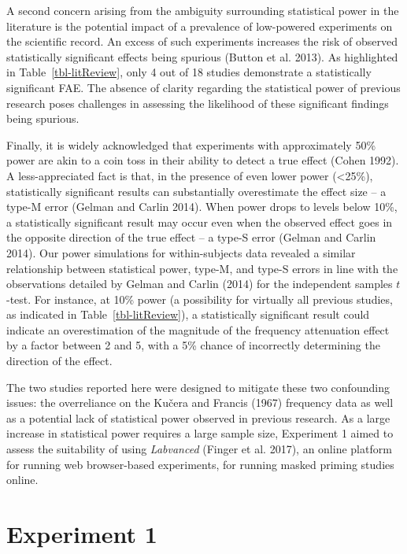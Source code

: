 \documentclass[
]{interact}
\begin{document}
A second concern arising from the ambiguity surrounding statistical
power in the literature is the potential impact of a prevalence of
low-powered experiments on the scientific record. An excess of such
experiments increases the risk of observed statistically significant
effects being spurious (Button et al. 2013). As highlighted in
Table~\ref{tbl-litReview}, only 4 out of 18 studies demonstrate a
statistically significant FAE. The absence of clarity regarding the
statistical power of previous research poses challenges in assessing the
likelihood of these significant findings being spurious.

Finally, it is widely acknowledged that experiments with approximately
50\% power are akin to a coin toss in their ability to detect a true
effect (Cohen 1992). A less-appreciated fact is that, in the presence of
even lower power (\textless25\%), statistically significant results can
substantially overestimate the effect size -- a type-M error (Gelman and
Carlin 2014). When power drops to levels below 10\%, a statistically
significant result may occur even when the observed effect goes in the
opposite direction of the true effect -- a type-S error (Gelman and
Carlin 2014). Our power simulations for within-subjects data revealed a
similar relationship between statistical power, type-M, and type-S
errors in line with the observations detailed by Gelman and Carlin
(2014) for the independent samples \(t\)-test. For instance, at 10\%
power (a possibility for virtually all previous studies, as indicated in
Table~\ref{tbl-litReview}), a statistically significant result could
indicate an overestimation of the magnitude of the frequency attenuation
effect by a factor between 2 and 5, with a 5\% chance of incorrectly
determining the direction of the effect.

The two studies reported here were designed to mitigate these two
confounding issues: the overreliance on the Kučera and Francis (1967)
frequency data as well as a potential lack of statistical power observed
in previous research. As a large increase in statistical power requires
a large sample size, Experiment 1 aimed to assess the suitability of
using \emph{Labvanced} (Finger et al. 2017), an online platform for
running web browser-based experiments, for running masked priming
studies online.

\section{Experiment 1}\label{sec-exp1}
\end{document}
